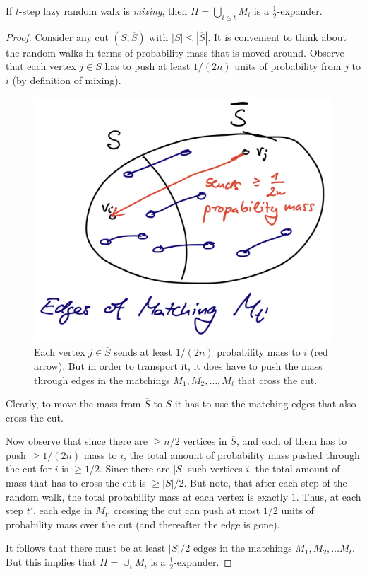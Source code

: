 \begin{lemma}
If $t$-step lazy random walk is \emph{mixing}, then $H = \bigcup_{i \leq t} M_i$ is a $\frac{1}{2}$-expander.
\end{lemma}
\begin{proof}
Consider any cut $(S, \overline{S})$ with $|S| \leq |\overline{S}|$. It is convenient to think about the random walks in terms of probability mass that is moved around. Observe that each vertex $j \in \overline{S}$ has to push at least $1/(2n)$ units of probability from $j$ to $i$ (by definition of mixing). 

\begin{figure}[!ht]
    \centering
    \includegraphics[scale=0.15]{./fig/MixingWalkIsExpander_lectureCutMatching.jpeg}
    \caption{Each vertex $j \in \overline{S}$ sends at least $1/(2n)$ probability mass to $i$ (red arrow). But in order to transport it, it does have to push the mass through edges in the matchings $M_1, M_2, \dots, M_t$ that cross the cut.}
    \label{fig:my_label}
\end{figure}

Clearly, to move the mass from $\overline{S}$ to $S$ it has to use the matching edges that also cross the cut.

Now observe that since there are $\geq n/2$ vertices in $\overline{S}$, and each of them has to push $\geq 1/(2n)$ mass to $i$, the total amount of probability mass pushed through the cut for $i$ is $\geq 1/2$. Since there are $|S|$ such vertices $i$, the total amount of mass that has to cross the cut is $\geq |S|/2$. 
But note, that after each step of the random walk, the total probability mass at each vertex is exactly $1$. Thus, at each step $t'$, each edge in $M_{t'}$ crossing the cut can push at most $1/2$ units of probability mass over the cut (and thereafter the edge is gone). 

It follows that there must be at least $|S|/2$ edges in the matchings $M_1, M_2, \dots M_{t}$. But this implies that $H = \cup_i M_i$ is a $\frac{1}{2}$-expander.

\end{proof}

